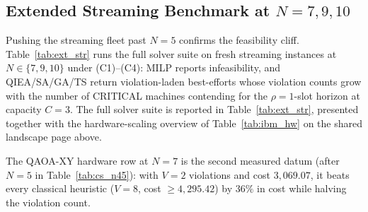 \subsection{Extended Streaming Benchmark at $N = 7, 9, 10$}
\label{sec:extended_streaming}

Pushing the streaming fleet past $N=5$ confirms the feasibility cliff. Table~\ref{tab:ext_str} runs the full solver suite on fresh streaming instances at $N\in\{7,9,10\}$ under (C1)--(C4): MILP reports infeasibility, and QIEA/SA/GA/TS return violation-laden best-efforts whose violation counts grow with the number of CRITICAL machines contending for the $\rho=1$-slot horizon at capacity $C=3$. The full solver suite is reported in Table~\ref{tab:ext_str}, presented together with the hardware-scaling overview of Table~\ref{tab:ibm_hw} on the shared landscape page above.

The QAOA-XY hardware row at $N=7$ is the second measured datum (after $N=5$ in Table~\ref{tab:cs_n45}): with $V=2$ violations and cost $3{,}069.07$, it beats every classical heuristic ($V=8$, cost $\geq 4{,}295.42$) by $36\%$ in cost while halving the violation count.

